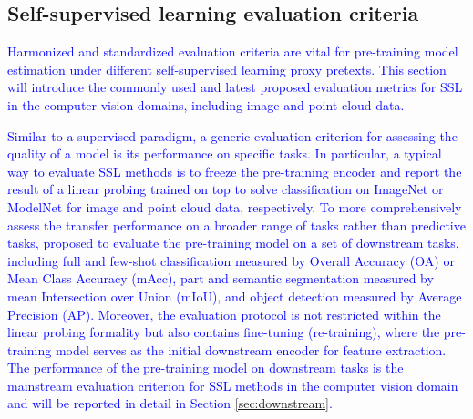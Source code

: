 \documentclass[a4paper,fleqn]{cas-dc}
\begin{document}
\subsection{Self-supervised learning evaluation criteria}
\textcolor{blue}{
Harmonized and standardized evaluation criteria are vital for pre-training model estimation under different self-supervised learning proxy pretexts. This section will introduce the commonly used and latest proposed evaluation metrics for SSL in the computer vision domains, including image and point cloud data.}



\textcolor{blue}{
Similar to a supervised paradigm, a generic evaluation criterion for assessing the quality of a model is its performance on specific tasks. In particular, a typical way to evaluate SSL methods is to freeze the pre-training encoder and report the result of a linear probing trained on top to solve classification on ImageNet \citep{russakovsky2015imagenet} or ModelNet \citep{wu20153d} for image and point cloud data, respectively. To more comprehensively assess the transfer performance on a broader range of tasks rather than predictive tasks, \citep{ericsson2021well} proposed to evaluate the pre-training model on a set of downstream tasks, including full and few-shot classification measured by Overall Accuracy (OA) or Mean Class Accuracy (mAcc), part and semantic segmentation measured by mean Intersection over Union (mIoU), and object detection measured by Average Precision (AP). Moreover, the evaluation protocol is not restricted within the linear probing formality but also contains fine-tuning (re-training), where the pre-training model serves as the initial downstream encoder for feature extraction. The performance of the pre-training model on downstream tasks is the mainstream evaluation criterion for SSL methods in the computer vision domain and will be reported in detail in Section \ref{sec:downstream}.}



\end{document}
